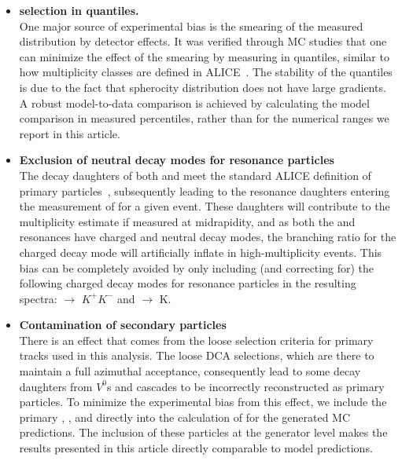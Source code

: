 \begin{itemize}
    \item \textbf{\SOPT selection in quantiles.}\\
    One major source of experimental bias is the smearing of the measured \SOPT distribution by detector effects. It was verified through MC studies that one can minimize the effect of the smearing by measuring \SOPT in quantiles, similar to how multiplicity classes are defined in ALICE~\cite{ALICE:2019dfi}. The stability of the quantiles is due to the fact that spherocity distribution does not have large gradients. A robust model-to-data comparison is achieved by calculating the model comparison in measured percentiles, rather than for the numerical \SOPT ranges we report in this article.
\end{itemize}

\begin{itemize}
    \item \textbf{Exclusion of neutral decay modes for resonance particles}\\
    The decay daughters of both \PHI and \KSTAR meet the standard ALICE definition of primary particles~\cite{alice_primary}, subsequently leading to the resonance daughters entering the measurement of \SOPT for a given event. These daughters will contribute to the multiplicity estimate if measured at midrapidity, and as both the \PHI and \KSTAR resonances have charged and neutral decay modes, the branching ratio for the charged decay mode will artificially inflate in high-multiplicity events. This bias can be completely avoided by only including (and correcting for) the following charged decay modes for resonance particles in the resulting spectra: \PHI $\rightarrow$ $K^+K^-$ and \KSTAR $\rightarrow$ K\PI. 
\end{itemize}

\begin{itemize}
    \item \textbf{Contamination of secondary particles}\\
    There is an effect that comes from the loose selection criteria for primary tracks used in this analysis. The loose DCA selections, which are there to maintain a full azimuthal acceptance, consequently lead to some decay daughters from $V^0$s and cascades to be incorrectly reconstructed as primary particles. To minimize the experimental bias from this effect, we include the primary \LA, \KOs, and \XI directly into the calculation of \SOPT for the generated MC predictions. The inclusion of these particles at the generator level makes the results presented in this article directly comparable to model predictions. 
\end{itemize}

